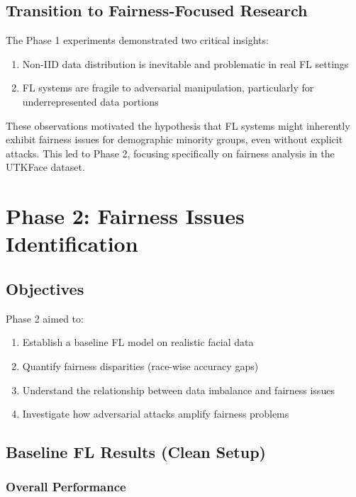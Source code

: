 \documentclass[11pt,a4paper]{report}
\begin{document}
\section{Transition to Fairness-Focused Research}

The Phase 1 experiments demonstrated two critical insights:

\begin{enumerate}
    \item Non-IID data distribution is inevitable and problematic in real FL settings
    \item FL systems are fragile to adversarial manipulation, particularly for underrepresented data portions
\end{enumerate}

These observations motivated the hypothesis that FL systems might inherently exhibit fairness issues for demographic minority groups, even without explicit attacks. This led to Phase 2, focusing specifically on fairness analysis in the UTKFace dataset.

\chapter{Phase 2: Fairness Issues Identification}

\section{Objectives}

Phase 2 aimed to:

\begin{enumerate}
    \item Establish a baseline FL model on realistic facial data
    \item Quantify fairness disparities (race-wise accuracy gaps)
    \item Understand the relationship between data imbalance and fairness issues
    \item Investigate how adversarial attacks amplify fairness problems
\end{enumerate}

\section{Baseline FL Results (Clean Setup)}

\subsection{Overall Performance}
\end{document}

